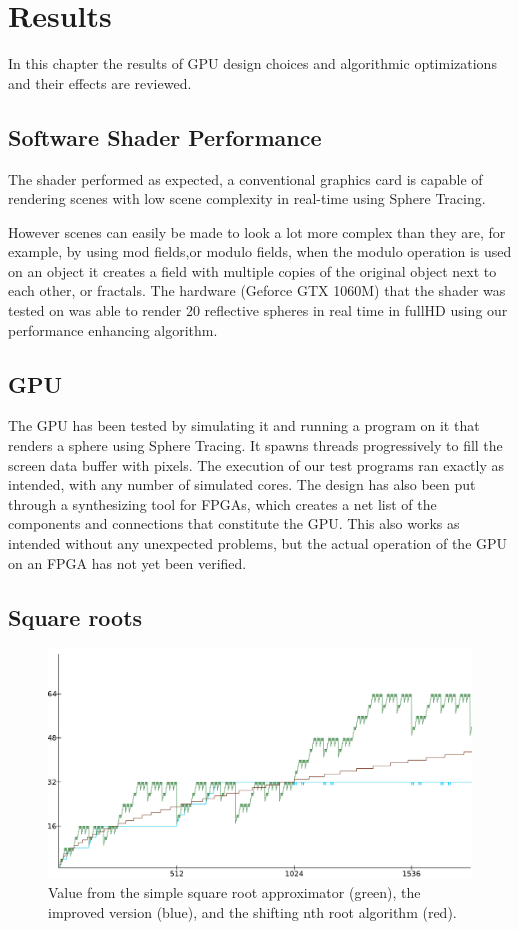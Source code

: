 \chapter{Results}

	In this chapter the results of GPU design choices and algorithmic optimizations
	and their effects are reviewed.

	\section{Software Shader Performance}

		The shader performed as expected, a conventional graphics card is 
		capable of rendering scenes with low scene complexity in real-time
		using Sphere Tracing.

		However scenes can easily be made to look a lot more complex than they 
		are, for example, by using mod fields,or modulo fields, when the modulo 
		operation is used on an object it creates a field with multiple copies 
		of the original object next to each other, or fractals. The hardware 
		(Geforce GTX 1060M) that the shader was tested on was able to render 
		20 reflective spheres in real time in fullHD using our performance enhancing 
		algorithm.


	\section{GPU}
	
	The GPU has been tested by simulating it and running a program on it that 
	renders a sphere using Sphere Tracing. It spawns threads progressively to 
	fill the screen data buffer with pixels. The execution of our test programs 
	ran exactly as intended, with any number of simulated cores. The design has 
	also been put through a synthesizing tool for FPGAs, which creates a net 
	list of the components and connections that constitute the GPU. This also 
	works as intended without any unexpected problems, but the actual operation 
	of the GPU on an FPGA has not yet been verified.
	
	
	\section{Square roots}

		\begin{figure}[H]
			\centering
			\includegraphics[width=0.75\linewidth]{figure/value12x.png} 
			\caption{Value from the simple square root approximator (green),
				the improved version (blue), and the shifting nth root 
				algorithm (red).}
			\label{orsqrt2}
		\end{figure}

